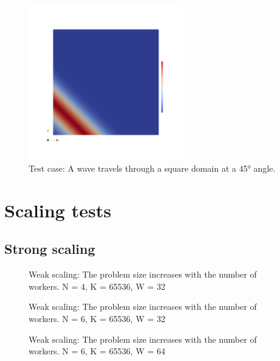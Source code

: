 \begin{figure}[H]
	\centering
	\includegraphics[width=0.6\textwidth]{Chapter_results/media/problem_1}
	\caption{Test case: A wave travels through a square domain at a 45° angle.}
	\label{fig:problem}
\end{figure}

\section{Scaling tests} \label{section:results:scaling_tests}

\subsection{Strong scaling} \label{section:results:scaling_tests:strong}

\begin{figure}[H]
	\centering
	
	\caption{Weak scaling: The problem size increases with the number of workers. N = 4, K = 65536, W = 32}
	\label{fig:strong_scaling_N4_W32}
\end{figure}

\begin{figure}[H]
	\centering
	
	\caption{Weak scaling: The problem size increases with the number of workers. N = 6, K = 65536, W = 32}
	\label{fig:strong_scaling_N6_W32}
\end{figure}

\begin{figure}[H]
	\centering
	
	\caption{Weak scaling: The problem size increases with the number of workers. N = 6, K = 65536, W = 64}
	\label{fig:strong_scaling_N6_W64}
\end{figure}

